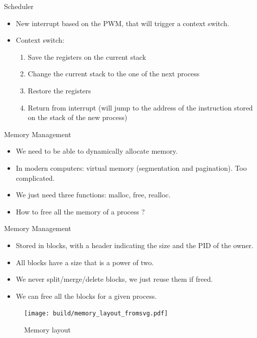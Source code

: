 \documentclass{beamer}
\begin{document}
    \begin{frame}{Scheduler}
      \begin{itemize}
        \item New interrupt based on the PWM, that will trigger a context switch.
        \item Context switch:
        \begin{enumerate}
           \item Save the registers on the current stack
           \item Change the current stack to the one of the next process
           \item Restore the registers
           \item Return from interrupt (will jump to the address of the
             instruction stored on the stack of the new process)
        \end{enumerate}
      \end{itemize}
    \end{frame}


    \begin{frame}{Memory Management}
      \begin{itemize}
        \item We need to be able to dynamically allocate memory.
        \item In modern computers: virtual memory (segmentation and pagination).
          Too complicated.
        \item We just need three functions: malloc, free, realloc.
        \item How to free all the memory of a process ?
      \end{itemize}
    \end{frame}

    \begin{frame}{Memory Management}
      \begin{itemize}
        \item Stored in blocks, with a header indicating the size and the PID of
          the owner.
        \item All blocks have a size that is a power of two.
        \item We never split/merge/delete blocks, we just reuse them if freed.
        \item We can free all the blocks for a given process.
      \end{itemize}
    \end{frame}

    \begin{frame}[plain]
      \begin{figure}
        \begin{minipage}[c]{0.5\textwidth}
          \caption{Memory layout}
        \end{minipage}\hfill
        \begin{minipage}[c]{0.5\textwidth}
          \texttt{[image: build/memory\_layout\_fromsvg.pdf]}
        \end{minipage}
      \end{figure}
    \end{frame}
\end{document}
